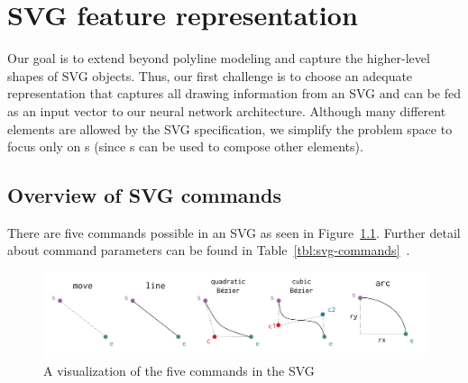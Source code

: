 \chapter{SVG feature representation}
Our goal is to extend beyond polyline modeling and capture the higher-level shapes of SVG objects.
Thus, our first challenge is to choose an adequate representation that captures all drawing information from an SVG and can be fed as an input vector to our neural network architecture.
Although many different elements are allowed by the SVG specification, we simplify the problem space to focus only on s (since s can be used to compose other elements). 

\section{Overview of SVG commands}
There are five commands possible in an SVG  as seen in Figure~\ref{fig:svg-commands}. Further detail about command parameters can be found in Table~\ref{tbl:svg-commands}~\cite{grasso2011svg}.

\begin{figure}[h]
    \centering
	\includegraphics[width=\textwidth]{figures/commands}
    \caption{A visualization of the five commands in the SVG \label{fig:svg-commands}}
\end{figure}


